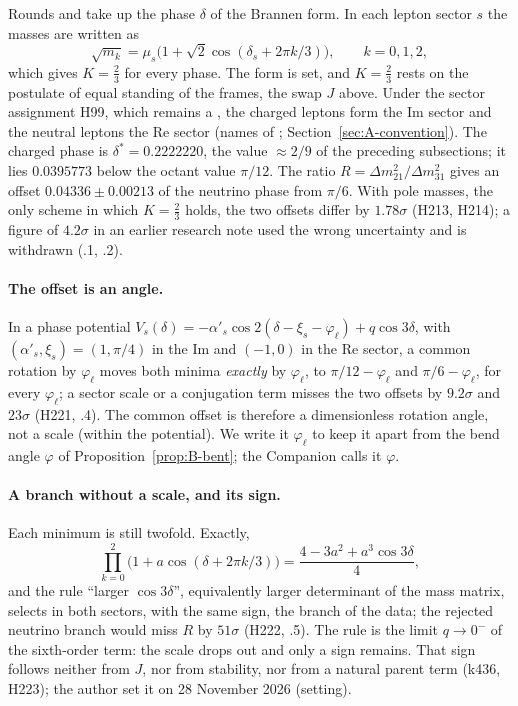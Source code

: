 Rounds  and  take up the phase $\delta$ of the Brannen form. In each lepton sector $s$ the masses are
written as
\begin{equation}
 \sqrt{m_k}=\mu_s\bigl(1+\sqrt2\cos(\delta_s+2\pi k/3)\bigr),\qquad k=0,1,2,
 \label{eq:B-brannen-sector}
\end{equation}
which gives $K=\tfrac23$ for every phase. The form is set, and $K=\tfrac23$ rests on the postulate of equal standing of the
frames, the swap $J$ above. Under the sector assignment H99, which remains a \Reading, the charged leptons form the Im sector and the
neutral leptons the Re sector (names of ; Section~\ref{sec:A-convention}). The charged phase is $\delta^*=0.2222220$, the
value $\approx2/9$ of the preceding subsections; it lies $0.0395773$ below the octant value $\pi/12$. The ratio
$R=\Delta m^2_{21}/\Delta m^2_{31}$ gives an offset $0.04336\pm0.00213$ of the neutrino phase from $\pi/6$. With pole masses,
the only scheme in which $K=\tfrac23$ holds, the two offsets differ by $1.78\sigma$ (H213, H214); a figure of $4.2\sigma$ in an
earlier research note used the wrong uncertainty and is withdrawn (.1, .2).

\paragraph{The offset is an angle.} In a phase potential $V_s(\delta)=-\alpha'_s\cos2(\delta-\xi_s-\varphi_\ell)+q\cos3\delta$, with
$(\alpha'_s,\xi_s)=(1,\pi/4)$ in the Im and $(-1,0)$ in the Re sector, a common rotation by $\varphi_\ell$ moves both minima
\emph{exactly} by $\varphi_\ell$, to $\pi/12-\varphi_\ell$ and $\pi/6-\varphi_\ell$, for every $\varphi_\ell$; a sector scale or a
conjugation term misses the two offsets by $9.2\sigma$ and $23\sigma$ (H221, .4). The common offset is therefore a
dimensionless rotation angle, not a scale \Established{} (within the potential). We write it $\varphi_\ell$ to keep it apart from the
bend angle $\varphi$ of Proposition~\ref{prop:B-bent}; the Companion calls it $\varphi$.

\paragraph{A branch without a scale, and its sign.} Each minimum is still twofold. Exactly,
\begin{equation}
 \prod_{k=0}^{2}\bigl(1+a\cos(\delta+2\pi k/3)\bigr)=\frac{4-3a^2+a^3\cos3\delta}{4},
 \label{eq:B-cubic-invariant}
\end{equation}
and the rule ``larger $\cos3\delta$'', equivalently larger determinant of the mass matrix, selects in both sectors, with the same sign,
the branch of the data; the rejected neutrino branch would miss $R$ by $51\sigma$ (H222, .5). The rule is the limit
$q\to0^-$ of the sixth-order term: the scale drops out and only a sign remains. That sign follows neither from $J$, nor from
stability, nor from a natural parent term (k436, H223); the author set it on 28 November 2026 \Conditional{} (setting).

